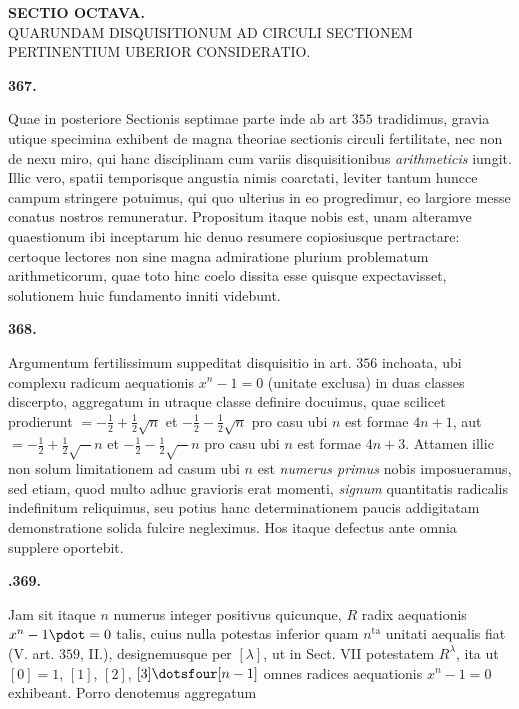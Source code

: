\clearpage{}
\renewcommand{\BookRunningTitle}{Sectio octava.}
\begin{center}
\textbf{SECTIO OCTAVA.}\\[1em]
QUARUNDAM DISQUISITIONUM AD CIRCULI SECTIONEM PERTINENTIUM UBERIOR CONSIDERATIO.
\end{center}
\par\medskip{}\centerline{\textbf{367.}}\nobreak\smallskip
Quae in posteriore Sectionis septimae parte inde ab art $355$ tradidimus, gravia utique specimina exhibent de magna theoriae sectionis circuli fertilitate, nec non de nexu miro, qui hanc disciplinam cum variis disquisitionibus \textit{arithmeticis} iungit. Illic vero, spatii temporisque angustia nimis coarctati, leviter tantum huncce campum stringere potuimus, qui quo ulterius in eo progredimur, eo largiore messe conatus nostros remuneratur. Propositum itaque nobis est, unam alteramve quaestionum ibi inceptarum hic denuo resumere copiosiusque pertractare: certoque lectores non sine magna admiratione plurium problematum arithmeticorum, quae toto hinc coelo dissita esse quisque expectavisset, solutionem huic fundamento inniti videbunt.
\par\medskip{}\centerline{\textbf{368.}}\nobreak\smallskip
Argumentum fertilissimum suppeditat disquisitio in art. $356$ inchoata, ubi complexu radicum aequationis $x^n-1=0$ (unitate exclusa) in duas classes discerpto, aggregatum in utraque classe definire docuimus, quae scilicet prodierunt $=-\frac12+\frac12\surd n$ et $-\frac12-\frac12\surd n$ pro casu ubi $n$ est formae $4n+1$, aut $=-\frac12+\frac12\surd -n$ et $-\frac12-\frac12\surd -n$ pro casu ubi $n$ est formae $4n+3$. Attamen illic non solum limitationem ad casum ubi $n$ est \textit{numerus primus} nobis imposueramus, sed etiam, quod multo adhuc gravioris erat momenti, \textit{signum} quantitatis radicalis indefinitum reliquimus, seu potius hanc determinationem paucis addigitatam demonstratione solida fulcire negleximus. Hos itaque defectus ante omnia supplere oportebit.
\par\medskip{}\centerline{\textbf{.369.}}\nobreak\smallskip
Jam sit itaque $n$ numerus integer positivus quicunque, $R$ radix aequationis $x^n-1\pdot=0$ talis, cuius nulla potestas inferior quam $n^{\mathrm{ta}}$ unitati aequalis fiat (V. art. $359$, II.), designemusque per $[\lambda]$, ut in Sect. VII potestatem $R^\lambda$, ita ut $[0]=1$, $[1]$, $[2]$, $[3]\dotsfour[n-1]$ omnes radices aequationis $x^n-1=0$ exhibeant. Porro denotemus aggregatum
